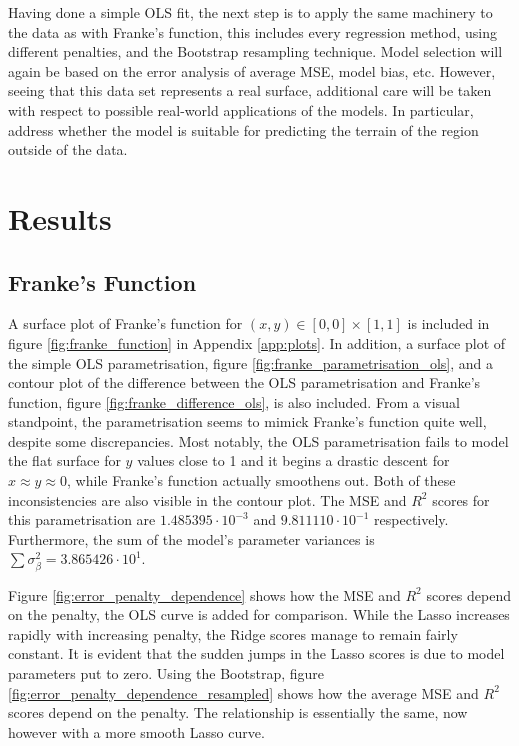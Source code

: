 \documentclass[reprint,english]{revtex4-1}
\begin{document}
Having done a simple OLS fit, the next step is to apply the same machinery to the data as with Franke's function, this includes every regression method, using different penalties, and the Bootstrap resampling technique. Model selection will again be based on the error analysis of average MSE, model bias, etc. However, seeing that this data set represents a real surface, additional care will be taken with respect to possible real-world applications of the models. In particular, address whether the model is suitable for predicting the terrain of the region outside of the data.
\section{Results}
\subsection{Franke's Function}
A surface plot of Franke's function for \((x,y)\in[0,0]\times[1,1]\) is included in figure \ref{fig:franke_function} in Appendix \ref{app:plots}. In addition, a surface plot of the simple OLS parametrisation, figure \ref{fig:franke_parametrisation_ols}, and a contour plot of the difference between the OLS parametrisation and Franke's function, figure \ref{fig:franke_difference_ols}, is also included. From a visual standpoint, the parametrisation seems to mimick Franke's function quite well, despite some discrepancies. Most notably, the OLS parametrisation fails to model the flat surface for \(y\) values close to 1 and it begins a drastic descent for \(x\approx y\approx0\), while Franke's function actually smoothens out. Both of these inconsistencies are also visible in the contour plot. The MSE and \(R^2\) scores for this parametrisation are \(1.485395\cdot10^{-3}\) and \(9.811110\cdot10^{-1}\) respectively. Furthermore, the sum of the model's parameter variances is \(\sum\sigma_{\beta}^2=3.865426\cdot10^1\).

Figure \ref{fig:error_penalty_dependence} shows how the MSE and \(R^2\) scores depend on the penalty, the OLS curve is added for comparison. While the Lasso increases rapidly with increasing penalty, the Ridge scores manage to remain fairly constant. It is evident that the sudden jumps in the Lasso scores is due to model parameters put to zero. Using the Bootstrap, figure \ref{fig:error_penalty_dependence_resampled} shows how the average MSE and \(R^2\) scores depend on the penalty. The relationship is essentially the same, now however with a more smooth Lasso curve.
\end{document}
